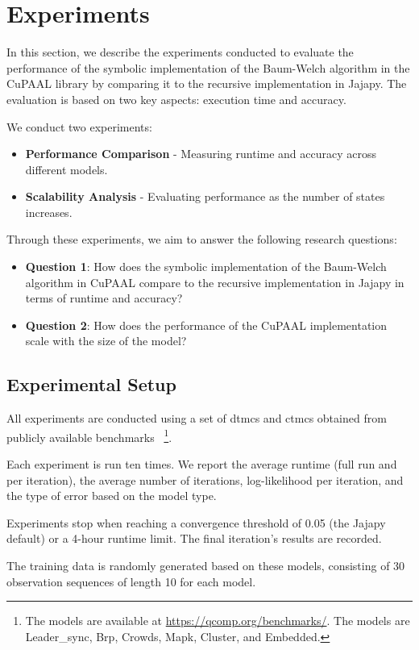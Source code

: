 \section{Experiments}\label{sec:experiments}
In this section, we describe the experiments conducted to evaluate the performance of the symbolic implementation of the Baum-Welch algorithm in the CuPAAL library by comparing it to the recursive implementation in Jajapy. The evaluation is based on two key aspects: execution time and accuracy.

We conduct two experiments:
\begin{itemize}
    \item \textbf{Performance Comparison} - Measuring runtime and accuracy across different models.
    \item \textbf{Scalability Analysis} - Evaluating performance as the number of states increases.
\end{itemize}

Through these experiments, we aim to answer the following research questions:
\begin{itemize}
    \item \textbf{Question 1}: How does the symbolic implementation of the Baum-Welch algorithm in CuPAAL compare to the recursive implementation in Jajapy in terms of runtime and accuracy?
    \item \textbf{Question 2}: How does the performance of the CuPAAL implementation scale with the size of the model?
\end{itemize}

\subsection{Experimental Setup}
All experiments are conducted using a set of \glspl{dtmc} and \glspl{ctmc} obtained from publicly available benchmarks~\cite{hartmanns2019quantitative}
\footnote{The models are available at \url{https://qcomp.org/benchmarks/}. The models are Leader\_sync, Brp, Crowds, Mapk, Cluster, and Embedded.}.

Each experiment is run ten times.
We report the average runtime (full run and per iteration), the average number of iterations, log-likelihood per iteration, and the type of error based on the model type.

Experiments stop when reaching a convergence threshold of 0.05 (the Jajapy default) or a 4-hour runtime limit. The final iteration's results are recorded.

The training data is randomly generated based on these models, consisting of 30 observation sequences of length 10 for each model.

